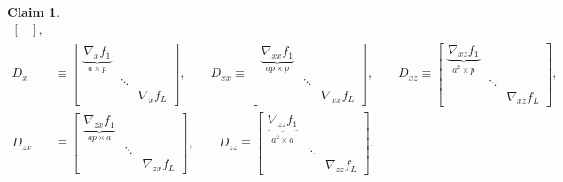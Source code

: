 \documentclass{article}
\newtheorem{claim}{Claim}
\begin{document}
\begin{claim}
\begin{align*}
\begin{bmatrix}
    \end{bmatrix}
    ,               \\
    D_x    & \equiv
    \begin{bmatrix}
      \underbrace{\nabla_x f_1}_{a\times p} &                       \\
                                            & \ddots                \\
                                            &        & \nabla_x f_L
    \end{bmatrix}
    , \qquad
    D_{xx} \equiv
    \begin{bmatrix}
      \underbrace{\nabla_{xx} f_1}_{ap\times p} &        &                 \\
                                                & \ddots &                 \\
                                                &        & \nabla_{xx} f_L
    \end{bmatrix}
    , \qquad
    D_{xz} \equiv
    \begin{bmatrix}
      \underbrace{\nabla_{xz} f_1}_{a^2 \times p} &        &                 \\
                                                  & \ddots &                 \\
                                                  &        & \nabla_{xz} f_L
    \end{bmatrix}
    ,               \\
    D_{zx} & \equiv
    \begin{bmatrix}
      \underbrace{\nabla_{zx} f_1}_{ap \times a} &        &                 \\
                                                 & \ddots &                 \\
                                                 &        & \nabla_{zx} f_L
    \end{bmatrix}
    ,
    \qquad
    D_{zz}  \equiv
    \begin{bmatrix}
      \underbrace{\nabla_{zz} f_1}_{a^2\times a} &        &                 \\
                                                 & \ddots &                 \\
                                                 &        & \nabla_{zz} f_L
    \end{bmatrix}
    .
  \end{align*}
\end{claim}
\end{document}
